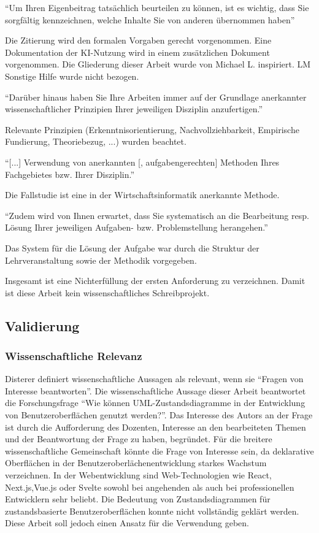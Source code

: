 \documentclass[first=Christoph,last=Hoentzsch,company=Softwareprojekt,location=Dresden,simple, noheader]{baarticle}
\begin{document}
\begin{basimple}
        \enquote{Um Ihren Eigenbeitrag tatsächlich beurteilen zu können, ist es wichtig, dass Sie sorgfältig kennzeichnen, welche Inhalte Sie von anderen übernommen haben}

        Die Zitierung wird den formalen Vorgaben gerecht vorgenommen.
        Eine Dokumentation der KI-Nutzung wird in einem zusätzlichen Dokument vorgenommen.
        Die Gliederung dieser Arbeit wurde von Michael L. inspiriert. {LM}
        Sonstige Hilfe wurde nicht bezogen.

        \enquote{Darüber hinaus haben Sie Ihre Arbeiten immer auf der Grundlage anerkannter wissenschaftlicher Prinzipien Ihrer jeweiligen Disziplin anzufertigen.}

        Relevante Prinzipien (Erkenntnisorientierung, Nachvollziehbarkeit, Empirische Fundierung, Theoriebezug, ...) wurden beachtet.

        \enquote{[...] Verwendung von anerkannten [, aufgabengerechten] Methoden Ihres Fachgebietes bzw. Ihrer Disziplin.}

        Die Fallstudie ist eine in der Wirtschaftsinformatik anerkannte Methode.

        \enquote{Zudem wird von Ihnen erwartet, dass Sie systematisch an die Bearbeitung resp. Lösung Ihrer jeweiligen Aufgaben- bzw. Problemstellung herangehen.}

        Das System für die Lösung der Aufgabe war durch die Struktur der Lehrveranstaltung sowie der Methodik vorgegeben.

        Insgesamt ist eine Nichterfüllung der ersten Anforderung zu verzeichnen. Damit ist diese Arbeit kein wissenschaftliches Schreibprojekt.

        \subsection{Validierung}
            \subsubsection{Wissenschaftliche Relevanz}    
            Disterer definiert wissenschaftliche Aussagen als relevant, wenn sie \enquote{Fragen von Interesse beantworten}. Die wissenschaftliche Aussage dieser Arbeit beantwortet die Forschungsfrage \enquote{Wie können \gls{UML}-Zustandsdiagramme in der Entwicklung von Benutzeroberflächen genutzt werden?}.
            Das Interesse des Autors an der Frage ist durch die Aufforderung des Dozenten, Interesse an den bearbeiteten Themen und der Beantwortung der Frage zu haben, begründet. 
            Für die breitere wissenschaftliche Gemeinschaft könnte die Frage von Interesse sein, da deklarative Oberflächen in der Benutzeroberlächenentwicklung starkes Wachstum verzeichnen. 
            In der Webentwicklung sind Web-Technologien wie React, Next.js,Vue.js oder Svelte sowohl bei angehenden als auch bei professionellen Entwicklern sehr beliebt.
            Die Bedeutung von Zustandsdiagrammen für zustandsbasierte Benutzeroberflächen konnte nicht vollständig geklärt werden.
            Diese Arbeit soll jedoch einen Ansatz für die Verwendung geben.


\end{basimple}
\end{document}
